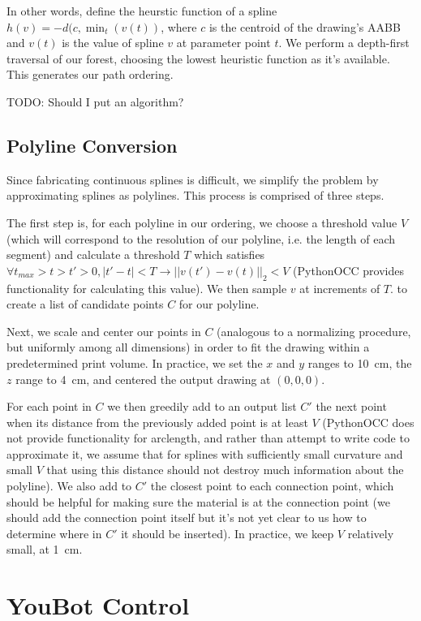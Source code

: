 \documentclass[conference]{acmsiggraph}
\begin{document}
In other words, define the heurstic function of a spline $h(v) = -d(c, \min_t(v(t))$, where $c$ is the centroid of the drawing's AABB and $v(t)$ is the value of spline $v$ at parameter point $t$.  We perform a depth-first traversal of our forest, choosing the lowest heuristic function as it's available.  This generates our path ordering.

TODO: Should I put an algorithm?


\subsection{Polyline Conversion}
Since fabricating continuous splines is difficult, we simplify the problem by approximating splines as polylines.  This process is comprised of three steps.

The first step is, for each polyline in our ordering, we choose a threshold value $V$ (which will correspond to the resolution of our polyline, i.e. the length of each segment) and calculate a threshold $T$ which satisfies $\forall t_{max} > t > t' > 0, |t' - t| < T \rightarrow ||v(t') - v(t)||_2 < V$ (PythonOCC provides functionality for calculating this value).  We then sample $v$ at increments of $T$. to create a list of candidate points $C$ for our polyline.  

Next, we scale and center our points in $C$ (analogous to a normalizing procedure, but uniformly among all dimensions) in order to fit the drawing within a predetermined print volume.  In practice, we set the $x$ and $y$ ranges to 10~cm, the $z$ range to 4~cm, and centered the output drawing at $(0, 0, 0)$.

For each point in $C$ we then greedily add to an output list $C'$ the next point when its distance from the previously added point is at least $V$ (PythonOCC does not provide functionality for arclength, and rather than attempt to write code to approximate it, we assume that for splines with sufficiently small curvature and small $V$ that using this distance should not destroy much information about the polyline).  We also add to $C'$ the closest point to each connection point, which should be helpful for making sure the material is at the connection point (we should add the connection point itself but it's not yet clear to us how to determine where in $C'$ it should be inserted).  In practice, we keep $V$ relatively small, at 1~cm.



\section{YouBot Control}
\end{document}
